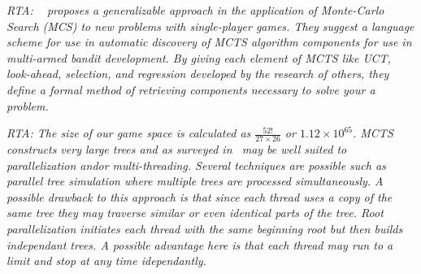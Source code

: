\documentclass[letterpaper]{article}
\begin{document}
\textit{RTA: ~\cite{maes2012monte} proposes a generalizable approach in the application of Monte-Carlo Search (MCS) to new problems with single-player games. They suggest a language scheme for use in automatic discovery of MCTS algorithm components for use in multi-armed bandit development. By giving each element of MCTS like UCT, look-ahead, selection, and regression developed by the research of others, they define a formal method of retrieving components necessary to solve your a problem.}

\textit{RTA: The size of our game space is calculated as $\frac{52!}{27\times26}$ or $1.12 \times 10^{65}$. MCTS constructs very large trees and as surveyed in~\cite{browne2012survey} may be well suited to parallelization and\/or multi-threading. Several techniques are possible such as parallel tree simulation where multiple trees are processed simultaneously. A possible drawback to this approach is that since each thread uses a copy of the same tree they may traverse similar or even identical parts of the tree. Root parallelization initiates each thread with the same beginning root but then builds independant trees. A possible advantage here is that each thread may run to a limit and stop at any time idependantly. }
\end{document}

